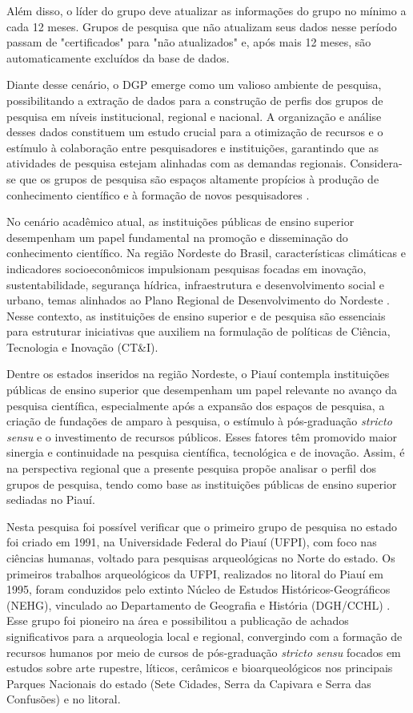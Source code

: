 \documentclass[portuguese]{textolivre}
\begin{document}
Além disso, o líder do grupo deve atualizar as informações do grupo no mínimo a cada 12 meses. Grupos de pesquisa que não atualizam seus dados nesse período passam de "certificados" para "não atualizados" e, após mais 12 meses, são automaticamente excluídos da base de dados.

Diante desse cenário, o DGP emerge como um valioso ambiente de pesquisa, possibilitando a extração de dados para a construção de perfis dos grupos de pesquisa em níveis institucional, regional e nacional. A organização e análise desses dados constituem um estudo crucial para a otimização de recursos e o estímulo à colaboração entre pesquisadores e instituições, garantindo que as atividades de pesquisa estejam alinhadas com as demandas regionais. Considera-se que os grupos de pesquisa são espaços altamente propícios à produção de conhecimento científico e à formação de novos pesquisadores \cite{silva2020}.

No cenário acadêmico atual, as instituições públicas de ensino superior desempenham um papel fundamental na promoção e disseminação do conhecimento científico. Na região Nordeste do Brasil, características climáticas e indicadores socioeconômicos impulsionam pesquisas focadas em inovação, sustentabilidade, segurança hídrica, infraestrutura e desenvolvimento social e urbano, temas alinhados ao Plano Regional de Desenvolvimento do Nordeste \cite{brasil2020}. Nesse contexto, as instituições de ensino superior e de pesquisa são essenciais para estruturar iniciativas que auxiliem na formulação de políticas de Ciência, Tecnologia e Inovação (CT\&I).

Dentre os estados inseridos na região Nordeste, o Piauí contempla instituições públicas de ensino superior que desempenham um papel relevante no avanço da pesquisa científica, especialmente após a expansão dos espaços de pesquisa, a criação de fundações de amparo à pesquisa, o estímulo à pós-graduação \textit{stricto sensu} e o investimento de recursos públicos. Esses fatores têm promovido maior sinergia e continuidade na pesquisa científica, tecnológica e de inovação. Assim, é na perspectiva regional que a presente pesquisa propõe analisar o perfil dos grupos de pesquisa, tendo como base as instituições públicas de ensino superior sediadas no Piauí.

Nesta pesquisa foi possível verificar que o primeiro grupo de pesquisa no estado foi criado em 1991, na Universidade Federal do Piauí (UFPI), com foco nas ciências humanas, voltado para pesquisas arqueológicas no Norte do estado. Os primeiros trabalhos arqueológicos da UFPI, realizados no litoral do Piauí em 1995, foram conduzidos pelo extinto Núcleo de Estudos Históricos-Geográficos (NEHG), vinculado ao Departamento de Geografia e História (DGH/CCHL) \cite{silva2017}. Esse grupo foi pioneiro na área e possibilitou a publicação de achados significativos para a arqueologia local e regional, convergindo com a formação de recursos humanos por meio de cursos de pós-graduação \textit{stricto sensu} focados em estudos sobre arte rupestre, líticos, cerâmicos e bioarqueológicos nos principais Parques Nacionais do estado (Sete Cidades, Serra da Capivara e Serra das Confusões) e no litoral.
\end{document}
